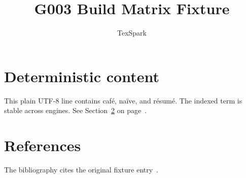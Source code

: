 \documentclass{article}
\title{G003 Build Matrix Fixture}
\author{TexSpark}
\begin{document}
\maketitle

\section{Deterministic content}\label{sec:content}
This plain UTF-8 line contains café, naïve, and résumé.
The indexed term is stable across engines.
See Section~\ref{sec:references} on page~\pageref{sec:references}.

\section{References}\label{sec:references}
The bibliography cites the original fixture entry~\cite{g003-fixture}.



\printindex
\end{document}
